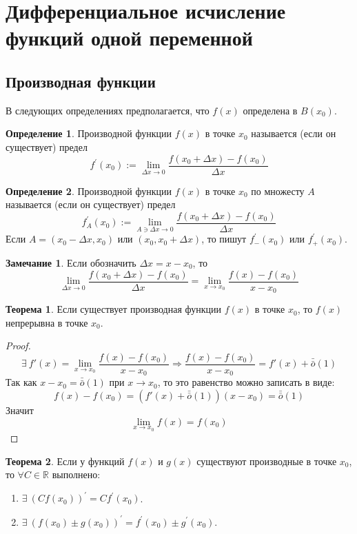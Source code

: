 \documentclass[a4paper, 12pt]{article}
\newcommand{\R}{\mathbb{R}}
\theoremstyle{definition}
\newtheorem*{definition}{Определение}
\newtheorem*{theorem}{Теорема}
\newtheorem*{comm}{Замечание}
\begin{document}
    \section{Дифференциальное исчисление функций одной переменной}
    \subsection{Производная функции}
        В следующих определениях предполагается, что $f(x)$ определена в $B(x_0)$.
        \begin{definition}
            Производной функции $f(x)$ в точке $x_0$ называется (если он существует) предел
             \[f^{\prime}(x_0):=\lim\limits_{\Delta x\to 0}\frac{f(x_0+\Delta x)-f(x_0)}{\Delta x}\]
        \end{definition} 
        \begin{definition}
            Производной функции $f(x)$ в точке $x_0$ по множесту $A$ называется (если он существует) предел 
            \[f_A^{\prime}(x_0):=\lim\limits_{A \ni \Delta x\to 0}\frac{f(x_0+\Delta x)-f(x_0)}{\Delta x}\]
            Если $A=(x_0-\Delta x, x_0)$ или $(x_0,x_0+\Delta x)$, то пишут $f_{-}^{\prime}(x_0)$ или $f_{+}^{\prime}(x_0)$. 
        \end{definition} 
        \begin{comm} Если обозначить $\Delta x=x-x_0$, то
            \[\lim\limits_{\Delta x\to 0}\frac{f(x_0+\Delta x)-f(x_0)}{\Delta x}=\lim\limits_{x\to x_0}\frac{f(x)-f(x_0)}{x-x_0}\]
        \end{comm} 
        \begin{theorem}
            Если существует производная функции $f(x)$ в точке $x_0$, то $f(x)$ непрерывна в точке $x_0$.
        \end{theorem} 
         \begin{proof}
            \[\exists\ f'(x)=\lim\limits_{x\to x_0}\frac{f(x)-f(x_0)}{x-x_0} \Rightarrow \frac{f(x)-f(x_0)}{x-x_0}=f'(x)+\bar{\bar{o}}{(1)}\]
            Так как $x-x_0=\bar{\bar{o}}{(1)}$ при $x\to x_0$, то это равенство можно записать в виде:
            \[f(x)-f(x_0)=(f'(x)+\bar{\bar{o}}{(1)})(x-x_0)=\bar{\bar{o}}{(1)}\]
            Значит
            \[\lim\limits_{x\to x_0}f(x)=f(x_0)\]
        \end{proof}
        \begin{theorem}
            Если у функций $f(x)$ и $g(x)$ существуют производные в точке $x_0$, то $\forall C\in \R$ выполнено:
            \begin{enumerate}
                \item $\exists\ (Cf(x_0))^{\prime}=C f^{\prime}(x_0)$.
                \item $\exists\ (f(x_0)\pm g(x_0))^{\prime}=f^{\prime}(x_0)\pm g^{\prime}(x_0)$.
            \end{enumerate}
        \end{theorem} 
\end{document}
